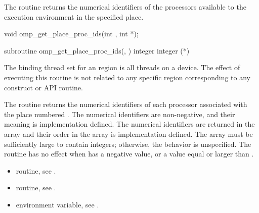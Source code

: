 \summary
The  routine returns the numerical identifiers of the processors available to the execution environment in the specified place.

\format
\ccppspecificstart
\begin{boxedcode}
void omp\_get\_place\_proc\_ids(int , int *);
\end{boxedcode}
\ccppspecificend

\fortranspecificstart
\begin{boxedcode}
subroutine omp\_get\_place\_proc\_ids(, )
integer 
integer (*)
\end{boxedcode}
\fortranspecificend

\binding
The binding thread set for an  region is all 
threads on a device. The effect of executing this routine is not related to 
any specific region corresponding to any construct or API routine.

\effect
The  routine returns the numerical 
identifiers of each processor associated with the place numbered 
. The numerical identifiers are non-negative, and 
their meaning is implementation defined.  The numerical identifiers 
are returned in the array  and their order in the array is 
implementation defined. The array must be sufficiently large to contain 
\code{)} integers; 
otherwise, the behavior is unspecified.  The routine has no effect when 
 has a negative value, or a value equal or larger 
than .

\crossreferences
\begin{itemize}
\item {} routine, see 
.

\item {} routine, see 
.

\item {} environment variable, see 
.
\end{itemize}




\subsection{}
\label{subsec:omp_get_place_num}

